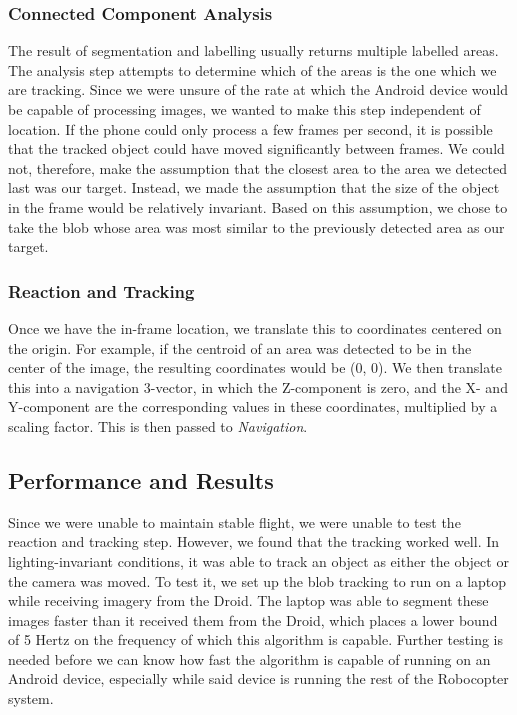 \subsubsection{Connected Component Analysis}
The result of segmentation and labelling usually returns multiple
labelled areas. The analysis step attempts to determine which of the
areas is the one which we are tracking. Since we were unsure of the
rate at which the Android device would be capable of processing
images, we wanted to make this step independent of location. If the
phone could only process a few frames per second, it is possible that
the tracked object could have moved significantly between frames. We
could not, therefore, make the assumption that the closest area to the
area we detected last was our target. Instead, we made the assumption
that the size of the object in the frame would be relatively
invariant. Based on this assumption, we chose to take the blob whose
area was most similar to the previously detected area as our target.

\subsubsection{Reaction and Tracking}
Once we have the in-frame location, we translate this to coordinates
centered on the origin. For example, if the centroid of an area was
detected to be in the center of the image, the resulting coordinates
would be (0, 0). We then translate this into a navigation 3-vector, in
which the Z-component is zero, and the X- and Y-component are the
corresponding values in these coordinates, multiplied by a scaling
factor. This is then passed to \emph{Navigation}.

\subsection{Performance and Results}
Since we were unable to maintain stable flight, we were unable to test
the reaction and tracking step. However, we found that the tracking
worked well. In lighting-invariant conditions, it was able to track an
object as either the object or the camera was moved. To test it, we
set up the blob tracking to run on a laptop while receiving imagery
from the Droid. The laptop was able to segment these images faster
than it received them from the Droid, which places a lower bound of 5
Hertz on the frequency of which this algorithm is capable. Further
testing is needed before we can know how fast the algorithm is capable
of running on an Android device, especially while said device is
running the rest of the Robocopter system.

